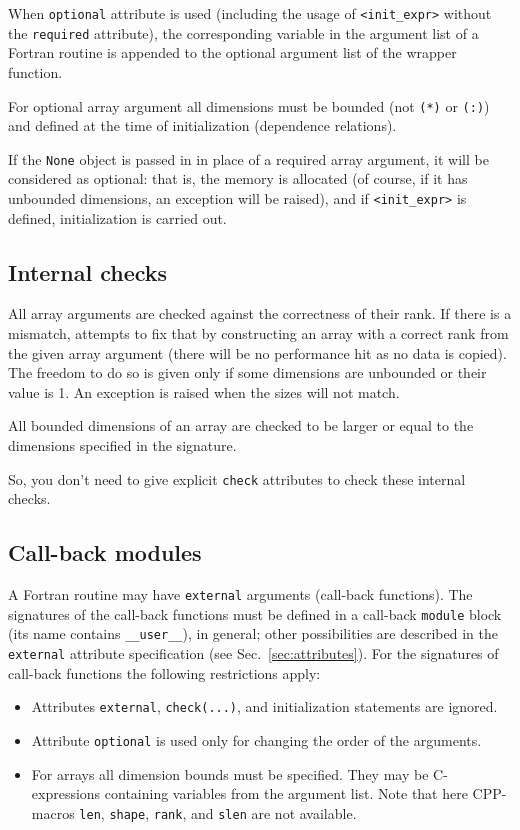 When \texttt{optional} attribute is used (including the usage of
\texttt{<init\_expr>} without the \texttt{required} attribute), the
corresponding variable in the argument list of a Fortran routine is
appended to the optional argument list of the wrapper function.

For optional array argument all dimensions must be bounded (not
\texttt{(*)} or \texttt{(:)}) and defined at the time of
initialization (dependence relations).

If the \texttt{None} object is passed in in place of a required array
argument, it will be considered as optional: that is, the memory is
allocated (of course, if it has unbounded dimensions, an exception
will be raised), and if \texttt{<init\_expr>} is defined,
initialization is carried out.


\subsection{Internal checks}
\label{sec:intchecks}

All array arguments are checked against the correctness of their rank.
If there is a mismatch, \fpy attempts to fix that by constructing an
array with a correct rank from the given array argument (there will be
no performance hit as no data is copied).  The freedom to do so is
given only if some dimensions are unbounded or their value is 1.  An
exception is raised when the sizes will not match.

All bounded dimensions of an array are checked to be larger or equal
to the dimensions specified in the signature.

So, you don't need to give explicit \texttt{check} attributes to check
these internal checks.


\subsection{Call-back modules}
\label{sec:cbmodule}

A Fortran routine may have \texttt{external} arguments (call-back
functions). The signatures of the call-back functions must be defined
in a call-back \texttt{module} block (its name contains
\texttt{\_\_user\_\_}), in general; other possibilities are described
in the \texttt{external} attribute specification (see
Sec.~\ref{sec:attributes}). For the signatures of call-back
functions the following restrictions apply:
\begin{itemize}
\item Attributes \texttt{external}, \texttt{check(...)}, and
  initialization statements are ignored.
\item Attribute \texttt{optional} is used only for changing the order
  of the arguments.
\item For arrays all dimension bounds must be specified. They may be
  C-expressions  containing variables from the argument list.
  Note that here CPP-macros \texttt{len}, \texttt{shape},
  \texttt{rank}, and \texttt{slen} are not available.
\end{itemize}


